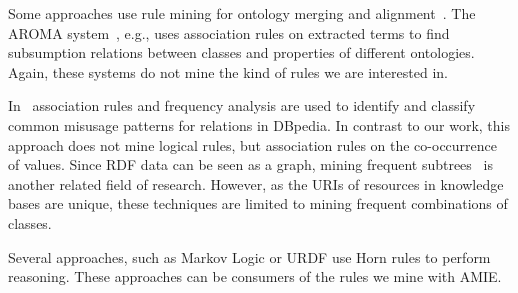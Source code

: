 Some approaches use rule mining for ontology merging and alignment~\cite{McgFikRic00,DavGuiBri07,NoyMus00}. 
The AROMA system~\cite{DavGuiBri07}, e.g., uses association rules on extracted terms to find subsumption relations between classes and properties of different ontologies. 
Again, these systems do not mine the kind of rules we are interested in.


In~\cite{Abedjan:2012:ROW:2396761.2398467} association rules and frequency analysis are used to identify and classify common misusage patterns for relations in DBpedia.
In contrast to our work, this approach does not mine logical rules, but association rules on the co-occurrence of values.
Since RDF data can be seen as a graph, mining frequent subtrees~\cite{ChiMunNij04,KurKar01} is another related field of research. 
However, as the URIs of resources in knowledge bases are unique, these techniques are limited to mining frequent combinations of classes.

Several approaches, such as Markov Logic \cite {markovlogic} or URDF \cite{urdf} use Horn rules to perform reasoning. These approaches can be consumers of the rules we mine with AMIE.

